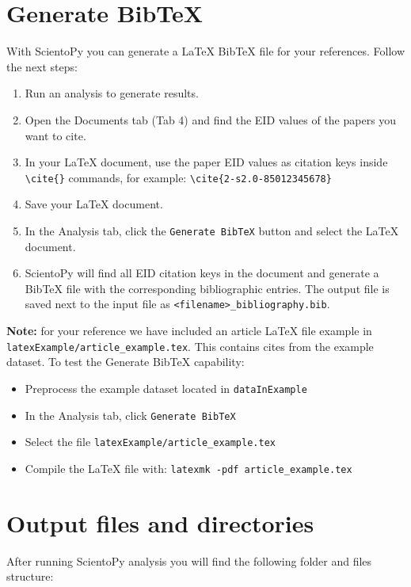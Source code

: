 \documentclass[10pt,letterpaper]{article}
\begin{document}
\section{Generate BibTeX}
\label{sec_bibtex}

With ScientoPy you can generate a \LaTeX{} BibTeX file for your references. Follow the next steps:

\begin{enumerate}
\item Run an analysis to generate results.
\item Open the Documents tab (Tab 4) and find the EID values of the papers you want to cite.
\item In your LaTeX document, use the paper EID values as citation keys inside \verb|\cite{}| commands, for example: \verb|\cite{2-s2.0-85012345678}|
\item Save your LaTeX document.
\item In the Analysis tab, click the \verb|Generate BibTeX| button and select the LaTeX document.
\item ScientoPy will find all EID citation keys in the document and generate a BibTeX file with the corresponding bibliographic entries. The output file is saved next to the input file as \verb|<filename>_bibliography.bib|.
\end{enumerate}

\textbf{Note:} for your reference we have included an article LaTeX file example in \verb|latexExample/article_example.tex|. This contains cites from the example dataset. To test the Generate BibTeX capability:
\begin{itemize}
\item Preprocess the example dataset located in \verb|dataInExample|
\item In the Analysis tab, click \verb|Generate BibTeX|
\item Select the file \verb|latexExample/article_example.tex|
\item Compile the LaTeX file with: \verb|latexmk -pdf article_example.tex|
\end{itemize}


\section{Output files and directories}

After running ScientoPy analysis you will find the following folder and files structure:

\vspace*{0.5cm}
\end{document}
